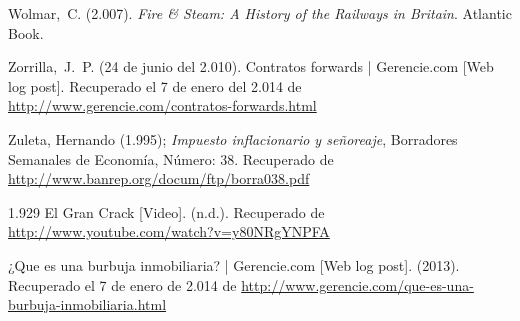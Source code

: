 \begin{thebibliography}{11}
	\bibitem{}
		Wolmar, C. (2.007). \emph{Fire \& Steam: A History of the Railways in Britain}. Atlantic Book.

	\bibitem{}
		Zorrilla, J. P. (24 de junio del 2.010). Contratos forwards | Gerencie.com [Web log post]. Recuperado el 7 de enero del 2.014 de \url{http://www.gerencie.com/contratos-forwards.html} 

	\bibitem{}
		Zuleta, Hernando (1.995); \emph{Impuesto inflacionario y señoreaje}, Borradores Semanales de Economía, Número: 38. Recuperado de \url{http://www.banrep.org/docum/ftp/borra038.pdf}

	\bibitem{}
		1.929 El Gran Crack [Video]. (n.d.). Recuperado de \url{http://www.youtube.com/watch?v=y80NRgYNPFA}

	\bibitem{}
		¿Que es una burbuja inmobiliaria? | Gerencie.com [Web log post]. (2013). Recuperado el 7 de enero de 2.014 de \url{http://www.gerencie.com/que-es-una-burbuja-inmobiliaria.html}

\end{thebibliography}
